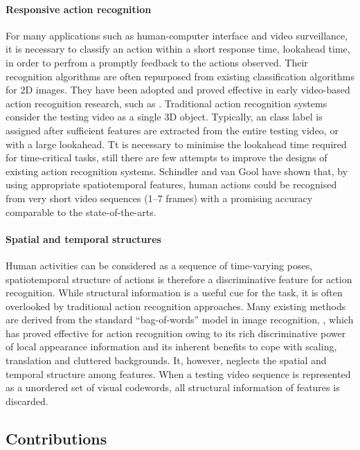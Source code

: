 \paragraph{Responsive action recognition}  
For many applications such as human-computer interface and video surveillance, it is necessary to classify an action within a short response time, \ie lookahead time, in order to perfrom a promptly feedback to the actions observed. 
Their recognition algorithms are often repurposed from existing classification algorithms for 2D images. They have been adopted and proved effective in early video-based action recognition research, such as \cite{Schuldt2004, Dollar2005}.  
Traditional action recognition systems consider the testing video as a single 3D object. 
Typically, an class label is assigned after sufficient features are extracted from the entire testing video, or with a large lookahead. Tt is necessary to minimise the lookahead time required for time-critical tasks, still there are few attempts to improve the designs of existing action recognition systems.  
Schindler and van Gool \cite{Schindler2008} have shown that, by using appropriate spatiotemporal features, human actions could be recognised from very short video sequences (1--7 frames) with a promising accuracy comparable to the state-of-the-arts.

\paragraph{Spatial and temporal structures}
Human activities can be considered as a sequence of time-varying poses, spatiotemporal structure of actions is therefore a discriminative feature for action recognition.  
While structural information is a useful cue for the task, it is often overlooked by traditional action recognition approaches.  
Many existing methods are derived from the standard ``bag-of-words'' model in image recognition, \eg \cite{Schuldt2004, Dollar2005, Laptev2008, Niebles2008}, which has proved effective for action recognition owing to its rich discriminative power of local appearance information and its inherent benefits to cope with scaling, translation and cluttered backgrounds. 
It, however, neglects the spatial and temporal structure among features. 
When a testing video sequence is represented as a unordered set of visual codewords, all structural information of features is discarded. 

\subsection{Contributions}


